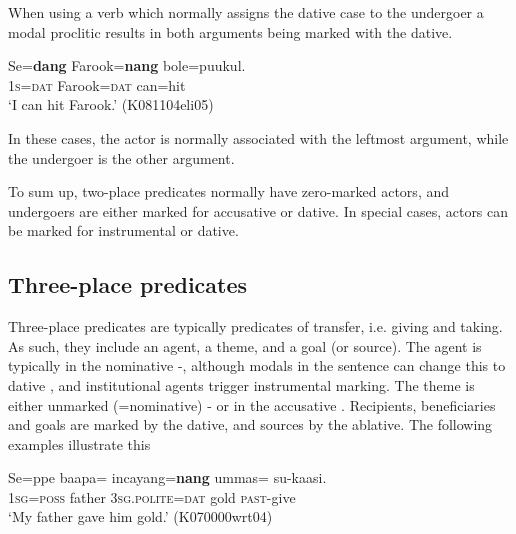 When using a verb which normally assigns the dative case to the undergoer  a modal proclitic results in  both arguments being  marked with the dative.


\ea
\gll Se=\textbf{dang} Farook=\textbf{nang} bole=puukul. \\
     \textsc{1s=dat} Farook=\textsc{dat} can=hit  \\
    `I can hit Farook.' (K081104eli05)
\z


In these cases, the actor is normally associated with the leftmost argument, while the undergoer is the other argument.  

% 


To sum up, two-place predicates normally have zero-marked actors, and undergoers are either marked for accusative or dative. In special cases, actors can be marked for instrumental or dative.



\subsection{Three-place predicates}\label{sec:argstr:Three-placepredicates}
Three-place predicates are typically predicates of transfer, i.e. giving and taking. As such, they include an agent, a theme, and a goal (or source). The agent is typically in the nominative -, although modals in the sentence can change this to dative , and institutional agents trigger instrumental marking.  The theme is either unmarked (=nominative) - or in the accusative . Recipients, beneficiaries and goals are marked by the dative, and sources by the ablative. The following examples illustrate this


\ea \label{ex:argstr:3:zzd:ummas}
\gll Se=ppe    baapa=\zero{}  incayang=\textbf{nang}    ummas=\zero{} su-kaasi. \\
      1\textsc{sg}=\textsc{poss} father 3\textsc{sg}.\textsc{polite}=\textsc{dat} gold \textsc{past}-give\\
    `My father gave him gold.'  (K070000wrt04)
\z      


